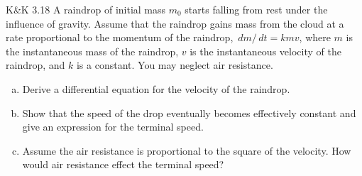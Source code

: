 \documentclass{esg8012pset}
\renewcommand{\d}{\,d}
\begin{document}
\begin{problem}{K\&K 3.18}
  A raindrop of initial mass $m_0$ starts falling from rest under the influence of gravity. Assume that the raindrop gains mass from the cloud at a rate proportional to the momentum of the raindrop, $\d m / \d t = k m v$, where $m$ is the instantaneous mass of the raindrop, $v$ is the instantaneous velocity of the raindrop, and $k$ is a constant. You may neglect air resistance.
  \begin{enumerate}[(a)]
    \item Derive a differential equation for the velocity of the raindrop.
    \item Show that the speed of the drop eventually becomes effectively constant and give an expression for the terminal speed.
    \item Assume the air resistance is proportional to the square of the velocity. How would air resistance effect the terminal speed?
  \end{enumerate}
\end{problem}
\end{document}
